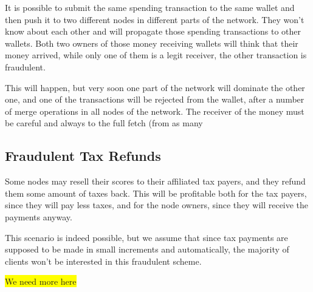\documentclass[11pt,oneside]{article}
\begin{document}
It is possible to submit the same spending transaction to the same wallet
and then push it to two different nodes in different parts of the network.
They won't know about each other and will propagate those spending
transactions to other wallets. Both two owners of those money receiving
wallets will think that their money arrived, while only one of them is
a legit receiver, the other transaction is fraudulent.

This will happen, but very soon one part of the network will dominate the other
one, and one of the transactions will be rejected from the wallet, after
a number of merge operations in all nodes of the network. The receiver of the
money must be careful and always to the full fetch (from as many

\subsection{Fraudulent Tax Refunds}

Some nodes may resell their scores to their affiliated tax payers, and they
refund them some amount of taxes back. This will be profitable both for
the tax payers, since they will pay less taxes, and for the node owners,
since they will receive the payments anyway.

This scenario is indeed possible, but we assume that since tax payments are
supposed to be made in small increments and automatically, the majority of
clients won't be interested in this fraudulent scheme.

\colorbox{yellow}{We need more here}
\end{document}
